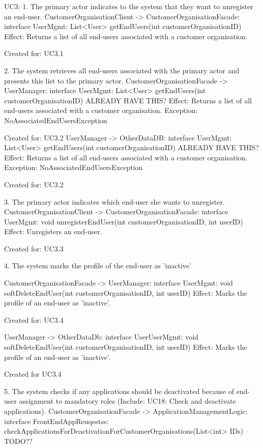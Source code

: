     UC3:
        1. The primary actor indicates to the system that they want to unregister an end-user.
            CustomerOrganisationClient -> CustomerOrganisationFacade: interface UserMgmt: List<User> getEndUsers(int customerOrganisationID)
                Effect: Returns a list of all end-users associated with a customer organisation.
                \item Created for: UC3.1

        2. The system retrieves all end-users associated with the primary actor and presents this list to the primary actor.
            CustomerOrganisationFacade -> UserManager: interface UserMgmt: List<User> getEndUsers(int customerOrganisationID) ALREADY HAVE THIS?
                Effect: Returns a list of all end-users associated with a customer organisation.
                Exception: NoAssociatedEndUsersException
                \item Created for: UC3.2
            UserManager -> OtherDataDB: interface UserMgmt: List<User> getEndUsers(int customerOrganisationID) ALREADY HAVE THIS?
                Effect: Returns a list of all end-users associated with a customer organisation.
                Exception: NoAssociatedEndUsersException
                \item Created for: UC3.2

        3. The primary actor indicates which end-user she wants to unregister.
            CustomerOrganisationClient -> CustomerOrganisationFacade: interface UserMgmt: void unregisterEndUser(int customerOrganisationID, int userID)
                Effect: Unregisters an end-user.
                \item Created for: UC3.3

        4. The system marks the profile of the end-user as 'inactive'

            CustomerOrganisationFacade -> UserManager: interface UserMgmt: void softDeleteEndUser(int customerOrganisationID, int userID)
                Effect: Marks the profile of an end-user as 'inactive'.
                \item Created for: UC3.4

            UserManager -> OtherDataDb: interface UserUserMgmt: void softDeleteEndUser(int customerOrganisationID, int userID)
                Effect: Marks the profile of an end-user as 'inactive'.
                \item Created for UC3.4

        5. The system checks if any applications should be deactivated because of end-user assignment to mandatory roles (Include: UC18: Check and deactivate applications).
            CustomerOrganisationFacade -> ApplicationManagementLogic: interface FrontEndAppReuqestss: checkApplicationsForDeactivationForCustomerOrganisations(List<int> IDs)
                TODO??

